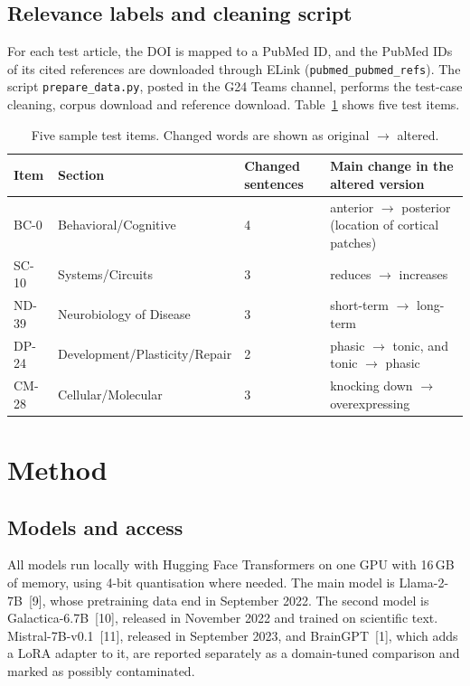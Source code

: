 \documentclass[10pt,a4paper]{article}
\begin{document}
\subsection{Relevance labels and cleaning script}
For each test article, the DOI is mapped to a PubMed ID, and the PubMed IDs of its cited references are downloaded through ELink (\texttt{pubmed\_pubmed\_refs}). The script \texttt{prepare\_data.py}, posted in the G24 Teams channel, performs the test-case cleaning, corpus download and reference download. Table~\ref{tab:samples} shows five test items.

\begin{table}[h]
\centering\small
\caption{Five sample test items. Changed words are shown as original $\rightarrow$ altered.}
\label{tab:samples}
\begin{tabular}{lllp{6.3cm}}
\toprule
Item & Section & Changed sentences & Main change in the altered version\\
\midrule
BC-0   & Behavioral/Cognitive          & 4 & anterior $\rightarrow$ posterior (location of cortical patches)\\
SC-10  & Systems/Circuits              & 3 & reduces $\rightarrow$ increases\\
ND-39  & Neurobiology of Disease       & 3 & short-term $\rightarrow$ long-term\\
DP-24  & Development/Plasticity/Repair & 2 & phasic $\rightarrow$ tonic, and tonic $\rightarrow$ phasic\\
CM-28  & Cellular/Molecular            & 3 & knocking down $\rightarrow$ overexpressing\\
\bottomrule
\end{tabular}
\end{table}

\section{Method}\label{sec:method}
\subsection{Models and access}
All models run locally with Hugging Face Transformers on one GPU with 16\,GB of memory, using 4-bit quantisation where needed. The main model is Llama-2-7B~[9], whose pretraining data end in September 2022. The second model is Galactica-6.7B~[10], released in November 2022 and trained on scientific text. Mistral-7B-v0.1~[11], released in September 2023, and BrainGPT~[1], which adds a LoRA adapter to it, are reported separately as a domain-tuned comparison and marked as possibly contaminated.
\end{document}
